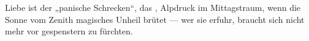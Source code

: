 Liebe ist der „panische Schrecken“, das , Alpdruck im Mittagstraum, wenn die Sonne vom Zenith magisches Unheil brütet — wer sie erfuhr, braucht sich nicht mehr vor gespenstern zu fürchten.
\par

